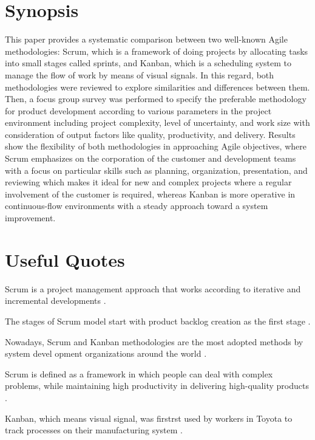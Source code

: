 \section{Synopsis}
\label{s:Synopsis-4}
This paper provides a systematic comparison between two well-known Agile
methodologies: Scrum, which is a framework of doing projects by allocating tasks
into small stages called sprints, and Kanban, which is a scheduling system to
manage the flow of work by means of visual signals. In this regard, both
methodologies were reviewed to explore similarities and differences between them.
Then, a focus group survey was performed to specify the preferable methodology
for product development according to various parameters in the project
environment including project complexity, level of uncertainty, and work size
with consideration of output factors like quality, productivity, and delivery.
Results show the flexibility of both methodologies in approaching Agile
objectives, where Scrum emphasizes on the corporation of the customer and
development teams with a focus on particular skills such as planning,
organization, presentation, and reviewing which makes it ideal for new and
complex projects where a regular involvement of the customer is required,
whereas Kanban is more operative in continuous-flow environments with a steady
approach toward a system improvement.

\section{Useful Quotes}
\label{s:Useful-Quotes-4}
Scrum is a project management approach that works according to iterative and
incremental developments \citep{zayatFrameworkStudyAgile2020}.

The stages of Scrum model start with product backlog creation as the first stage
\citep{zayatFrameworkStudyAgile2020}.

Nowadays, Scrum and Kanban methodologies are the most adopted methods by system
devel opment organizations around the world \citep{zayatFrameworkStudyAgile2020}.

Scrum is defined as a framework in which people can deal with complex problems,
while maintaining high productivity in delivering high-quality products
\citep{zayatFrameworkStudyAgile2020}.

Kanban, which means visual signal, was firstrst used by workers in Toyota to track
processes on their manufacturing system \citep{zayatFrameworkStudyAgile2020}.

